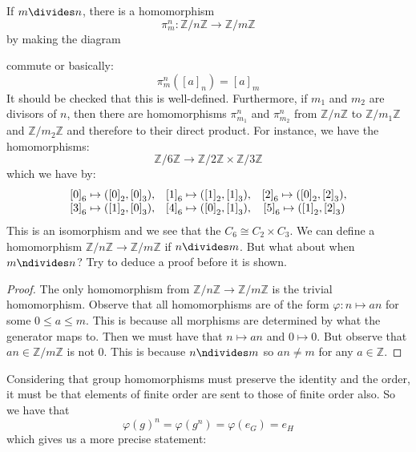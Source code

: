 \documentclass{report}
\begin{document}
If $m \divides n$, there is a homomorphism
    \begin{equation*}
        \pi^{n}_{m} : \mathbb{Z}/n\mathbb{Z} \rightarrow \mathbb{Z}/m\mathbb{Z}
    \end{equation*}
by making the diagram
    \begin{center}
    \end{center}
commute or basically:
    \begin{equation*}
        \pi^{n}_{m}([a]_{n}) = [a]_{m}
    \end{equation*}
It should be checked that this is well-defined. Furthermore, if $m_{1}$ and $m_{2}$ are divisors of $n$, then there are homomorphisms $\pi_{m_{1}}^{n}$ and $\pi_{m_{2}}^{n}$ from $\mathbb{Z}/n\mathbb{Z}$ to $\mathbb{Z}/m_{1}\mathbb{Z}$ and $\mathbb{Z}/m_{2}\mathbb{Z}$ and therefore to their direct product. For instance, we have the homomorphisms:
    \begin{equation*}
        \mathbb{Z}/6\mathbb{Z} \rightarrow \mathbb{Z}/2\mathbb{Z} \times \mathbb{Z}/3\mathbb{Z}
    \end{equation*}
which we have by:
    \begin{align*}
        \begin{array}{ c c c }
            {[0]}_{6} \mapsto ({[0]}_{2}, {[0]}_{3}), & {[1]}_{6} \mapsto ({[1]}_{2}, {[1]}_{3}), & {[2]}_{6} \mapsto ({[0]}_{2}, {[2]}_{3}), \\
            {[3]}_{6} \mapsto ({[1]}_{2}, {[0]}_{3}), & {[4]}_{6} \mapsto ({[0]}_{2}, {[1]}_{3}), & {[5]}_{6} \mapsto ({[1]}_{2}, {[2]}_{3})    
        \end{array}
    \end{align*}
This is an isomorphism and we see that the $C_{6} \cong C_{2} \times C_{3}$. We can define a homomorphism $\mathbb{Z}/n\mathbb{Z} \rightarrow \mathbb{Z}/m\mathbb{Z}$ if $n \divides m$. But what about when $m \ndivides n$? Try to deduce a proof before it is shown.
    \begin{proof}
        The only homomorphism from $\mathbb{Z}/n\mathbb{Z} \rightarrow \mathbb{Z}/m\mathbb{Z}$ is the trivial homomorphism. Observe that all homomorphisms are of the form $\varphi : n \mapsto an$ for some $0 \leq a \leq m$. This is because all morphisms are determined by what the generator maps to. Then we must have that $n \mapsto an$ and $0 \mapsto 0$. But observe that $an \in \mathbb{Z}/m\mathbb{Z}$ is not 0. This is because $n \ndivides m$ so $an \neq m$ for any $a \in \mathbb{Z}$.
    \end{proof}
Considering that group homomorphisms must preserve the identity and the order, it must be that elements of finite order are sent to those of finite order also. So we have that
    \begin{equation*}
        \varphi(g)^{n} = \varphi(g^{n}) = \varphi(e_{G}) = e_{H}
    \end{equation*}
which gives us a more precise statement:
\end{document}
